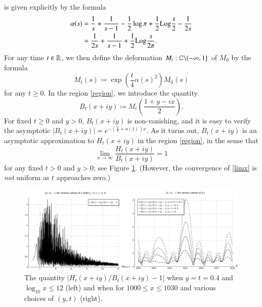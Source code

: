 is given explicitly by the formula
\begin{equation}\label{alpha-form}
\begin{split}
 \alpha(s) &= \frac{1}{s} + \frac{1}{s-1} - \frac{1}{2} \log \pi + \frac{1}{2} {\operatorname{Log}} \frac{s}{2} - \frac{1}{2s} \\
&= \frac{1}{2s} + \frac{1}{s-1} + \frac{1}{2} {\operatorname{Log}} \frac{s}{2\pi}.
\end{split}
\end{equation}
For any time $t \in \mathbb{R}$, we then define the deformation $M_t: \mathbb{C} \backslash (-\infty,1]$ of $M_0$ by the formula
\begin{equation}\label{Mt-def}
M_t(s) \coloneqq \exp\left( \frac{t}{4} \alpha(s)^2 \right) M_0(s)
\end{equation}
for any $t \geq 0$.
In the region \eqref{region}, we introduce the quantity
\begin{equation}\label{bo-def} 
B_t(x+iy) \coloneqq M_t\left(\frac{1+y-ix}{2}\right).
\end{equation} 
For fixed $t \geq 0$ and $y>0$, $B_t(x+iy)$ is non-vanishing, and it is easy to verify the asymptotic $|B_t(x+iy)| = e^{-(\frac{\pi}{8} + o(1)) x}$.  As it turns out, $B_t(x+iy)$ is an asymptotic approximation to $H_t(x+iy)$ in the region \eqref{region}, in the sense that
\begin{equation}\label{limx}
 \lim_{x \to \infty} \frac{H_t(x+iy)}{B_t(x+iy)} = 1
\end{equation}
for any fixed $t>0$ and $y>0$; see Figure \ref{ht-bt}.  (However, the convergence of \eqref{limx} is \emph{not} uniform as $t$ approaches zero.)

\begin{figure}[h!]
  \includegraphics[width=1.0\linewidth]{ftvsht.png}
  \caption{The quantity $|H_t(x+iy)/B_t(x+iy) - 1|$ when $y=t=0.4$ and $\log_{10} x \leq 12$ (left) and when for $1000 \leq x \leq 1030$ and various choices of $(y,t)$ (right).}
\label{ht-bt}
\end{figure}

